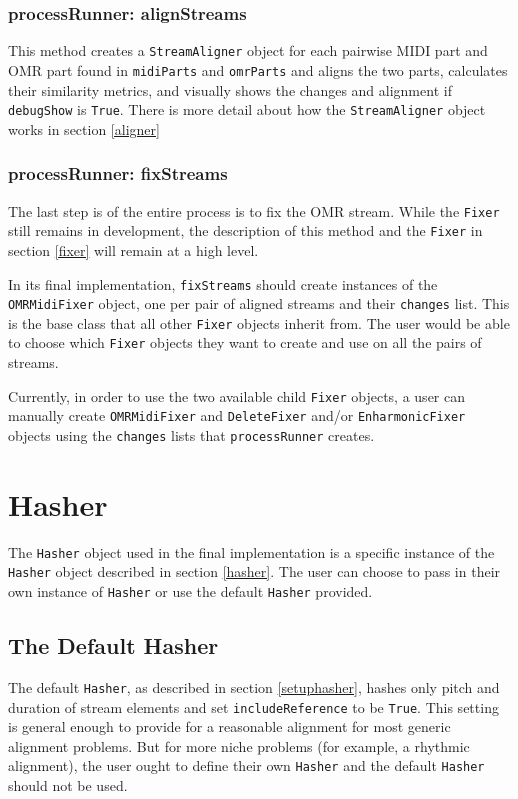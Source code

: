 \subsubsection{processRunner: alignStreams}
This method creates a \texttt{StreamAligner} object for each pairwise MIDI part and OMR part found in \texttt{midiParts} and \texttt{omrParts} and aligns the two parts, calculates their similarity metrics, and visually shows the changes and alignment if \texttt{debugShow} is \texttt{True}. There is more detail about how the \texttt{StreamAligner} object works in section \ref{aligner}

\subsubsection{processRunner: fixStreams}\label{processrunner2}
The last step is of the entire process is to fix the OMR stream. While the \texttt{Fixer} still remains in development, the description of this method and the \texttt{Fixer} in section \ref{fixer} will remain at a high level. 

In its final implementation, \texttt{fixStreams} should create instances of the \texttt{OMRMidiFixer} object, one per pair of aligned streams and their \texttt{changes} list. This is the base class that all other \texttt{Fixer} objects inherit from. The user would be able to choose which \texttt{Fixer} objects they want to create and use on all the pairs of streams. 

Currently, in order to use the two available child \texttt{Fixer} objects, a user can manually create \texttt{OMRMidiFixer} and \texttt{DeleteFixer} and/or \texttt{EnharmonicFixer} objects using the \texttt{changes} lists that \texttt{processRunner} creates.

\section{Hasher}
The \texttt{Hasher} object used in the final implementation is a specific instance of the \texttt{Hasher} object described in section \ref{hasher}. The user can choose to pass in their own instance of \texttt{Hasher} or use the default \texttt{Hasher} provided.

\subsection{The Default Hasher}
The default \texttt{Hasher}, as described in section \ref{setuphasher}, hashes only pitch and duration of stream elements and set \texttt{includeReference} to be \texttt{True}. This setting is general enough to provide for a reasonable alignment for most generic alignment problems. But for more niche problems (for example, a rhythmic alignment), the user ought to define their own \texttt{Hasher} and the default \texttt{Hasher} should not be used. 

